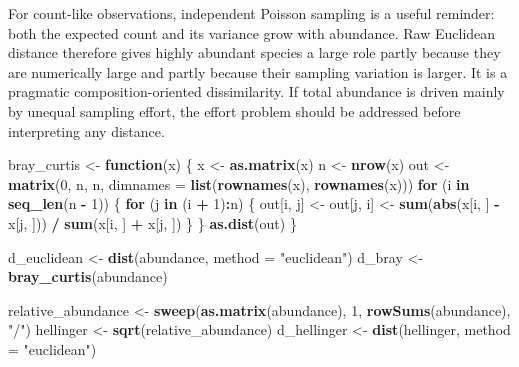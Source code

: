 \documentclass[
  english,
]{article}
\newenvironment{Shaded}{\begin{snugshade}}{\end{snugshade}}
\newcommand{\AttributeTok}[1]{\textcolor[rgb]{0.13,0.29,0.53}{#1}}
\newcommand{\ControlFlowTok}[1]{\textcolor[rgb]{0.13,0.29,0.53}{\textbf{#1}}}
\newcommand{\DecValTok}[1]{\textcolor[rgb]{0.00,0.00,0.81}{#1}}
\newcommand{\FunctionTok}[1]{\textcolor[rgb]{0.13,0.29,0.53}{\textbf{#1}}}
\newcommand{\NormalTok}[1]{#1}
\newcommand{\OtherTok}[1]{\textcolor[rgb]{0.56,0.35,0.01}{#1}}
\newcommand{\SpecialCharTok}[1]{\textcolor[rgb]{0.81,0.36,0.00}{\textbf{#1}}}
\newcommand{\StringTok}[1]{\textcolor[rgb]{0.31,0.60,0.02}{#1}}
\begin{document}
For count-like observations, independent Poisson sampling is a useful
reminder: both the expected count and its variance grow with abundance.
Raw Euclidean distance therefore gives highly abundant species a large
role partly because they are numerically large and partly because their
sampling variation is larger. It is a pragmatic composition-oriented
dissimilarity. If total abundance is driven mainly by unequal sampling
effort, the effort problem should be addressed before interpreting any
distance.

\begin{Shaded}
\begin{Highlighting}[]
\NormalTok{bray\_curtis }\OtherTok{\textless{}{-}} \ControlFlowTok{function}\NormalTok{(x) \{}
\NormalTok{  x }\OtherTok{\textless{}{-}} \FunctionTok{as.matrix}\NormalTok{(x)}
\NormalTok{  n }\OtherTok{\textless{}{-}} \FunctionTok{nrow}\NormalTok{(x)}
\NormalTok{  out }\OtherTok{\textless{}{-}} \FunctionTok{matrix}\NormalTok{(}\DecValTok{0}\NormalTok{, n, n, }\AttributeTok{dimnames =} \FunctionTok{list}\NormalTok{(}\FunctionTok{rownames}\NormalTok{(x), }\FunctionTok{rownames}\NormalTok{(x)))}
  \ControlFlowTok{for}\NormalTok{ (i }\ControlFlowTok{in} \FunctionTok{seq\_len}\NormalTok{(n }\SpecialCharTok{{-}} \DecValTok{1}\NormalTok{)) \{}
    \ControlFlowTok{for}\NormalTok{ (j }\ControlFlowTok{in}\NormalTok{ (i }\SpecialCharTok{+} \DecValTok{1}\NormalTok{)}\SpecialCharTok{:}\NormalTok{n) \{}
\NormalTok{      out[i, j] }\OtherTok{\textless{}{-}}\NormalTok{ out[j, i] }\OtherTok{\textless{}{-}} \FunctionTok{sum}\NormalTok{(}\FunctionTok{abs}\NormalTok{(x[i, ] }\SpecialCharTok{{-}}\NormalTok{ x[j, ])) }\SpecialCharTok{/} \FunctionTok{sum}\NormalTok{(x[i, ] }\SpecialCharTok{+}\NormalTok{ x[j, ])}
\NormalTok{    \}}
\NormalTok{  \}}
  \FunctionTok{as.dist}\NormalTok{(out)}
\NormalTok{\}}

\NormalTok{d\_euclidean }\OtherTok{\textless{}{-}} \FunctionTok{dist}\NormalTok{(abundance, }\AttributeTok{method =} \StringTok{"euclidean"}\NormalTok{)}
\NormalTok{d\_bray }\OtherTok{\textless{}{-}} \FunctionTok{bray\_curtis}\NormalTok{(abundance)}

\NormalTok{relative\_abundance }\OtherTok{\textless{}{-}} \FunctionTok{sweep}\NormalTok{(}\FunctionTok{as.matrix}\NormalTok{(abundance), }\DecValTok{1}\NormalTok{, }\FunctionTok{rowSums}\NormalTok{(abundance), }\StringTok{"/"}\NormalTok{)}
\NormalTok{hellinger }\OtherTok{\textless{}{-}} \FunctionTok{sqrt}\NormalTok{(relative\_abundance)}
\NormalTok{d\_hellinger }\OtherTok{\textless{}{-}} \FunctionTok{dist}\NormalTok{(hellinger, }\AttributeTok{method =} \StringTok{"euclidean"}\NormalTok{)}
\end{Highlighting}
\end{Shaded}
\end{document}
